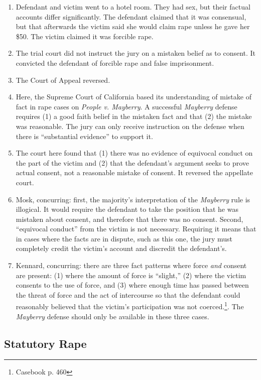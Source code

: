 \begin{enumerate}
    \item Defendant and victim went to a hotel room. They had sex, but their factual accounts differ significantly. The defendant claimed that it was consensual, but that afterwards the victim said she would claim rape unless he gave her \$50. The victim claimed it was forcible rape.
    \item The trial court did not instruct the jury on a mistaken belief as to consent. It convicted the defendant of forcible rape and false imprisonment.
    \item The Court of Appeal reversed.
    \item Here, the Supreme Court of California based its understanding of mistake of fact in rape cases on \emph{People v. Mayberry}. A successful \emph{Mayberry} defense requires (1) a good faith belief in the mistaken fact and that (2) the mistake was reasonable. The jury can only receive instruction on the defense when there is ``substantial evidence'' to support it.
    \item The court here found that (1) there was no evidence of equivocal conduct on the part of the victim and (2) that the defendant's argument seeks to prove actual consent, not a reasonable mistake of consent. It reversed the appellate court.
    \item Mosk, concurring: first, the majority's interpretation of the \emph{Mayberry} rule is illogical. It would require the defendant to take the position that he was mistaken about consent, and therefore that there was no consent. Second, ``equivocal conduct'' from the victim is not necessary. Requiring it means that in cases where the facts are in dispute, such as this one, the jury must completely credit the victim's account and discredit the defendant's.
    \item Kennard, concurring: there are three fact patterns where force \emph{and} consent are present: (1) where the amount of force is ``slight,'' (2) where the victim consents to the use of force, and (3) where enough time has passed between the threat of force and the act of intercourse so that the defendant could reasonably believed that the victim's participation was not coerced.\footnote{Casebook p. 460}. The \emph{Mayberry} defense should only be available in these three cases.
\end{enumerate}

\subsection{Statutory Rape}

